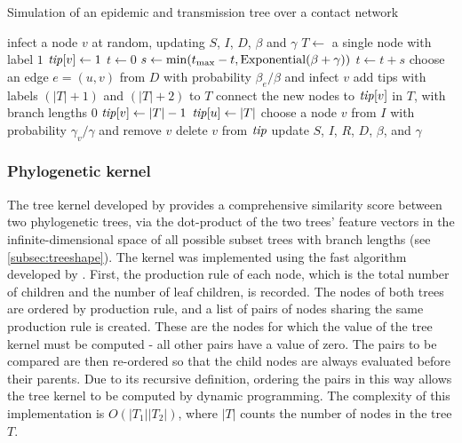 \begin{algorithm}
  \label{alg:nettree}
  \caption{Simulation of an epidemic and transmission tree over a contact network}
  \begin{algorithmic}
    \State infect a node $v$ at random, updating $S$, $I$, $D$, $\beta$ and $\gamma$
    \State $T \gets$ a single node with label $1$
    \State $\mathit{tip}[v] \gets 1$
    \State $t \gets 0$
      \State $s \gets \min(t_{\max} - t, \operatorname{Exponential}(\beta + \gamma))$
      \EndFor
      \State $t \gets t + s$
          \State choose an edge $e = (u, v)$ from $D$ with probability $\beta_e / \beta$
                 and infect $v$
          \State add tips with labels $(|T|+1)$ and $(|T|+2)$ to $T$
          \State connect the new nodes to $\mathit{tip}[v]$ in $T$, with branch lengths $0$
          \State $\mathit{tip}[v] \gets |T|-1$
          \State $\mathit{tip}[u] \gets |T|$
        \Else
          \State choose a node $v$ from $I$ with probability $\gamma_v / \gamma$
                 and remove $v$
          \State delete $v$ from $\mathit{tip}$
        \EndIf
        \State update $S$, $I$, $R$, $D$, $\beta$, and $\gamma$
      \EndIf
    \EndWhile
  \end{algorithmic}
\end{algorithm}

\subsubsection{Phylogenetic kernel}

The tree kernel developed by \textcite{poon2013mapping} provides a
comprehensive similarity score between two phylogenetic trees, via the
dot-product of the two trees' feature vectors in the infinite-dimensional space
of all possible subset trees with branch lengths (see \cref{subsec:treeshape}).
The kernel was implemented using the fast algorithm developed by
\textcite{moschitti2006making}. First, the production rule of each node, which
is the total number of children and the number of leaf children, is recorded.
The nodes of both trees are ordered by production rule, and a list of pairs of
nodes sharing the same production rule is created. These are the nodes for
which the value of the tree kernel must be computed - all other pairs have a
value of zero. The pairs to be compared are then re-ordered so that the child
nodes are always evaluated before their parents. Due to its recursive
definition, ordering the pairs in this way allows the tree kernel to be
computed by dynamic programming. The complexity of this implementation is
$O(|T_1||T_2|)$, where $|T|$ counts the number of nodes in the tree $T$.

